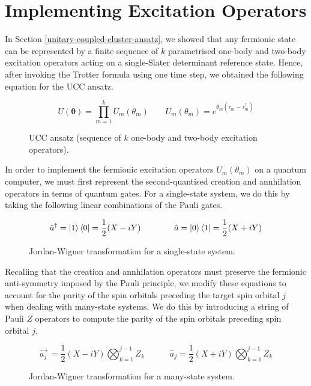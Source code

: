 \section{Implementing Excitation Operators}

In Section \ref{unitary-coupled-cluster-ansatz}, we showed that any fermionic state can be represented by a finite sequence of $k$ parametrised one-body and two-body excitation operators acting on a single-Slater determinant reference state. Hence, after invoking the Trotter formula using one time step, we obtained the following equation for the UCC ansatz.

\begin{figure}[H]
    \centering
    \begin{equation*}
        U(\bm\theta) = \prod_{m=1}^k U_m(\theta_m) \qquad
        U_m(\theta_m) = e^{\theta_m (\tau_m - \tau_m^\dagger)}
    \end{equation*}
    \caption{UCC ansatz (sequence of $k$ one-body and two-body excitation operators).}
\end{figure}

In order to implement the fermionic excitation operators $U_m(\theta_m)$ on a quantum computer, we must first represent the second-quantised creation and annhilation operators in terms of quantum gates. For a single-state system, we do this by taking the following linear combinations of the Pauli gates.

\begin{figure}[H]
    \centering
    \begin{equation*}
        \hat a^\dagger = \ket 1 \bra 0 = \frac{1}{2} (X - iY) \qquad\qquad
        \hat a = \ket 0 \bra 1 = \frac{1}{2} (X + iY) 
    \end{equation*}
    \caption{Jordan-Wigner transformation for a single-state system.}
\end{figure}

Recalling that the creation and annhilation operators must preserve the fermionic anti-symmetry imposed by the Pauli principle, we modify these equations to account for the parity of the spin orbitals preceding the target spin orbital $j$ when dealing with many-state systems. We do this by introducing a string of Pauli $Z$ operators to compute the parity of the spin orbitals preceding spin orbital $j$.

\begin{figure}[H]
    \centering
    \begin{equation*}
        \hat a_j^+ = \frac{1}{2} (X - iY) \bigotimes_{k=1}^{j-1} Z_k \qquad\quad
        \hat a_j = \frac{1}{2} (X + iY) \bigotimes_{k=1}^{j-1} Z_k
    \end{equation*}
    \caption{Jordan-Wigner transformation for a many-state system.}
\end{figure}

